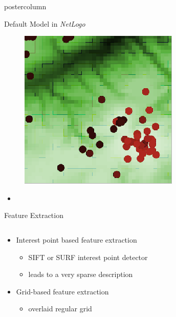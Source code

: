 \documentclass[final,hyperref={pdfpagelabels=false}]{beamer}
\begin{document}
\begin{frame}
\begin{columns}
\begin{column}{.33\textwidth}
\begin{beamercolorbox}[center,wd=\textwidth]{postercolumn}
\begin{minipage}[T]{.95\textwidth}
{\begin{block}{Default Model in \textit{NetLogo}}
\begin{figure}
                \includegraphics[width=1.0\linewidth]{images/netlogo}
              \end{figure}
              \begin{itemize}
                \item
              \end{itemize}
            \end{block}
            \vfill
            \begin{block}{Feature Extraction}
              \begin{columns}
                \begin{column}{.55\textwidth}
                  \begin{itemize}
                  \item Interest point based feature extraction
                    \begin{itemize}
                    \item SIFT or SURF interest point detector
                    \item leads to a \alert{very sparse} description
                    \end{itemize}
                  \item Grid-based feature extraction
                    \begin{itemize}
                    \item overlaid regular grid

\end{itemize}
\end{itemize}
\end{column}
\end{columns}
\end{block}}
\end{minipage}
\end{beamercolorbox}
\end{column}
\end{columns}
\end{frame}
\end{document}
